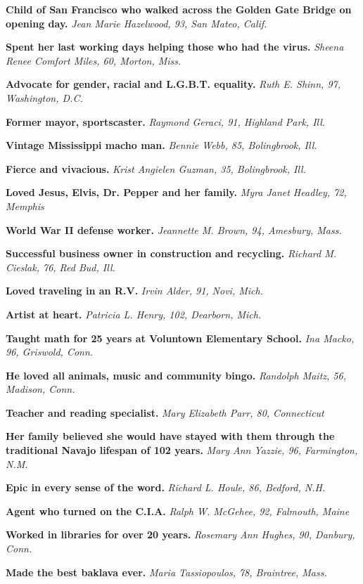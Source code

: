 \textbf{Child of San Francisco who walked across the Golden Gate Bridge
on opening day.} \emph{Jean Marie Hazelwood, 93, San Mateo, Calif.}

\textbf{Spent her last working days helping those who had the virus.}
\emph{Sheena Renee Comfort Miles, 60, Morton, Miss.}

\textbf{Advocate for gender, racial and L.G.B.T. equality.} \emph{Ruth
E. Shinn, 97, Washington, D.C.}

\textbf{Former mayor, sportscaster.} \emph{Raymond Geraci, 91, Highland
Park, Ill.}

\textbf{Vintage Mississippi macho man.} \emph{Bennie Webb, 85,
Bolingbrook, Ill.}

\textbf{Fierce and vivacious.} \emph{Krist Angielen Guzman, 35,
Bolingbrook, Ill.}

\textbf{Loved Jesus, Elvis, Dr. Pepper and her family.} \emph{Myra Janet
Headley, 72, Memphis}

\textbf{World War II defense worker.} \emph{Jeannette M. Brown, 94,
Amesbury, Mass.}

\textbf{Successful business owner in construction and recycling.}
\emph{Richard M. Cieslak, 76, Red Bud, Ill.}

\textbf{Loved traveling in an R.V.} \emph{Irvin Alder, 91, Novi, Mich.}

\textbf{Artist at heart.} \emph{Patricia L. Henry, 102, Dearborn, Mich.}

\textbf{Taught math for 25 years at Voluntown Elementary School.}
\emph{Ina Macko, 96, Griswold, Conn.}

\textbf{He loved all animals, music and community bingo.} \emph{Randolph
Maitz, 56, Madison, Conn.}

\textbf{Teacher and reading specialist.} \emph{Mary Elizabeth Parr, 80,
Connecticut}

\textbf{Her family believed she would have stayed with them through the
traditional Navajo lifespan of 102 years.} \emph{Mary Ann Yazzie, 96,
Farmington, N.M.}

\textbf{Epic in every sense of the word.} \emph{Richard L. Houle, 86,
Bedford, N.H.}

\textbf{Agent who turned on the C.I.A.} \emph{Ralph W. McGehee, 92,
Falmouth, Maine}

\textbf{Worked in libraries for over 20 years.} \emph{Rosemary Ann
Hughes, 90, Danbury, Conn.}

\textbf{Made the best baklava ever.} \emph{Maria Tassiopoulos, 78,
Braintree, Mass.}

